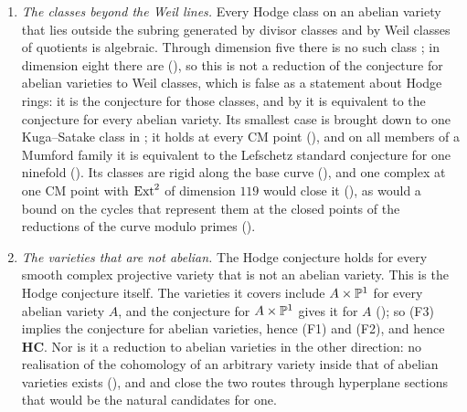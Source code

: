 \begin{corollary}
\begin{enumerate}[label=\textup{(F\arabic*)},leftmargin=3.0em,itemsep=4pt]
  to reach, $7n^{2}-2n$ for a general shape. For one family its
  conclusion is equivalent to the Lefschetz standard conjecture for one
  variety (). The bounded criterion \textup{(P1)} is not a
  second form of the same demand: by
   it is equivalent to the conclusion it was to imply,
  and  shows that the one cycle it could have been tested
  on, the transport of the base cycle, does not satisfy it.
\item \emph{The classes beyond the Weil lines.} Every Hodge class on an
  abelian variety that lies outside the subring generated by divisor classes
  and by Weil classes of quotients is algebraic. Through dimension five there
  is no such class \cite{MZ99}; in dimension eight there are
  (), so this is not a reduction of the conjecture
  for abelian varieties to Weil classes, which is false as a statement about
  Hodge rings: it is the conjecture for those classes, and by
   it is equivalent to the conjecture for every abelian
  variety. Its smallest case is
  brought down to one Kuga--Satake class in ; it holds at
  every CM point (), and on all members of a Mumford
  family it is equivalent to the Lefschetz standard conjecture for one
  ninefold (). Its classes are rigid along the base
  curve (), and one complex at one CM point with
  $\operatorname{Ext}^{2}$ of dimension $119$ would close it (),
  as would a bound on the cycles that represent them at the closed points of
  the reductions of the curve modulo primes ().
\item \emph{The varieties that are not abelian.} The Hodge conjecture holds
  for every smooth complex projective variety that is not an abelian variety.
  This is the Hodge conjecture itself. The varieties it covers include
  $A\times\mathbb{P}^{1}$ for every abelian variety $A$, and the conjecture for
  $A\times\mathbb{P}^{1}$ gives it for $A$ (); so (F3) implies
  the conjecture for abelian varieties, hence (F1) and (F2), and hence
  $\mathbf{HC}$. Nor is it a reduction to abelian varieties in the other
  direction: no realisation of the cohomology of an arbitrary variety inside
  that of abelian varieties exists (), and
   and  close the two routes
  through hyperplane sections that would be the natural candidates for one.
\end{enumerate}
\end{corollary}

